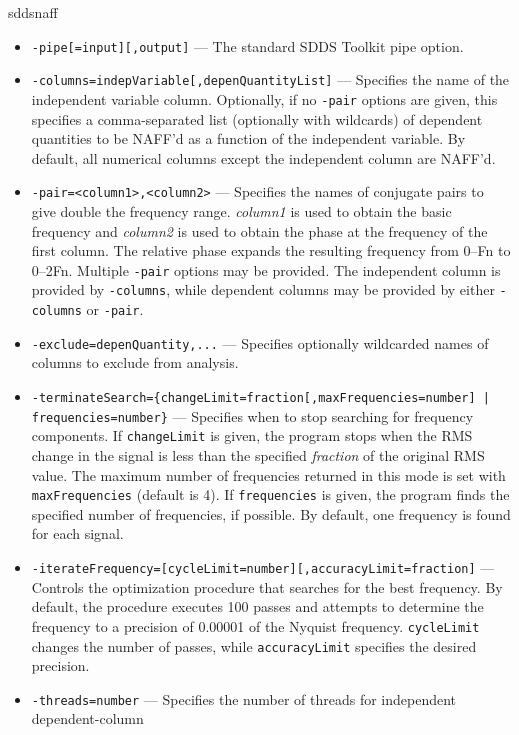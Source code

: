 \begin{sddsprog}{sddsnaff}
    \begin{itemize}
      \item \verb|-pipe[=input][,output]| --- The standard SDDS Toolkit pipe option.
      \item \verb|-columns=indepVariable[,depenQuantityList]| --- Specifies the name of the
        independent variable column. Optionally, if no \verb|-pair| options are given, this
        specifies a comma-separated list (optionally with wildcards) of dependent quantities to be
        NAFF'd as a function of the independent variable. By default, all numerical columns except
        the independent column are NAFF'd.
      \item \verb|-pair=<column1>,<column2>| --- Specifies the names of conjugate pairs to give
        double the frequency range. \emph{column1} is used to obtain the basic frequency and
        \emph{column2} is used to obtain the phase at the frequency of the first column. The
        relative phase expands the resulting frequency from 0--Fn to 0--2\*Fn. Multiple
        \verb|-pair| options may be provided. The independent column is provided by \verb|-columns|,
        while dependent columns may be provided by either \verb|-columns| or \verb|-pair|.
      \item \verb|-exclude=depenQuantity,...| --- Specifies optionally wildcarded names of columns to
        exclude from analysis.
      \item \verb!-terminateSearch={changeLimit=fraction[,maxFrequencies=number] | frequencies=number}! ---
        Specifies when to stop searching for frequency components. If \verb|changeLimit| is given,
        the program stops when the RMS change in the signal is less than the specified \emph{fraction}
        of the original RMS value. The maximum number of frequencies returned in this mode is set with
        \verb|maxFrequencies| (default is 4). If \verb|frequencies| is given, the program finds the
        specified number of frequencies, if possible. By default, one frequency is found for each
        signal.
      \item \verb|-iterateFrequency=[cycleLimit=number][,accuracyLimit=fraction]| --- Controls the
        optimization procedure that searches for the best frequency. By default, the procedure
        executes 100 passes and attempts to determine the frequency to a precision of 0.00001 of the
        Nyquist frequency. \verb|cycleLimit| changes the number of passes, while \verb|accuracyLimit|
        specifies the desired precision.
      \item \verb|-threads=number| --- Specifies the number of threads for independent dependent-column

\end{itemize}
\end{sddsprog}

